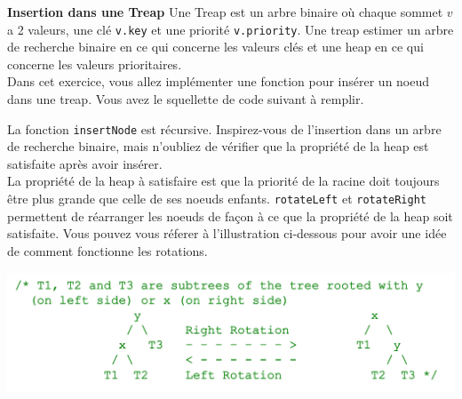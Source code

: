 \begin{Exercice}[20 minutes]\textbf{Insertion dans une Treap}
    Une Treap est un arbre binaire où chaque sommet $v$ a 2 valeurs, une clé \lstinline{v.key} et une priorité \lstinline{v.priority}. Une treap estimer
    un arbre de recherche binaire en ce qui concerne les valeurs clés et une heap en ce qui concerne les valeurs prioritaires. \\

    Dans cet exercice, vous allez implémenter une fonction pour insérer un noeud dans une treap. Vous avez le squellette de code suivant à remplir.
    

    \begin{conseil}
        La fonction \lstinline{insertNode} est récursive. Inspirez-vous de l'insertion dans un arbre de recherche binaire, mais 
        n'oubliez de vérifier que la propriété de la heap est satisfaite après avoir insérer. \\
        La propriété de la heap à satisfaire est que la priorité de la racine doit toujours être plus grande que celle de ses noeuds enfants.
        \lstinline{rotateLeft} et \lstinline{rotateRight} permettent de réarranger les noeuds de façon à ce que la propriété
        de la heap soit satisfaite. Vous pouvez vous réferer à l'illustration ci-dessous pour avoir une idée de comment fonctionne les rotations.
    \end{conseil}

    \begin{center}
        \includegraphics[width=\linewidth]{treap_heap_property.png}
    \end{center}

    \begin{solution}
    
    \end{solution}
    \begin{solution}
        
    \end{solution}
    
\end{Exercice}

